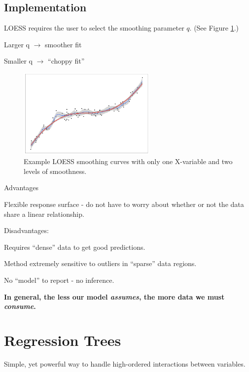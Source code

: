 \documentclass[12pt]{notes}
\begin{document}
\subsection{Implementation}
LOESS requires the user to select the smoothing parameter $q$. (See Figure \ref{fig:loessCurve}.) 
\bi
\item Larger q $\rightarrow$ smoother fit
\item Smaller q $\rightarrow$ ``choppy fit''
\ei


\begin{figure}[H]
\centering
\includegraphics[width = 0.6\textwidth]{figures/module4/loessCurve.png}
\caption{Example LOESS smoothing curves with only one X-variable and two levels of smoothness.}
\label{fig:loessCurve}
\end{figure}

\bi
\item Advantages
\bi
\item Flexible response surface - do not have to worry about whether or not the data share a linear relationship. 
\ei
\item Disadvantages:
\bi
\item Requires ``dense'' data to get good predictions. 
\bi
\item Method extremely sensitive to outliers in ``sparse'' data regions. 
\ei
\item No ``model'' to report - no inference. 
\ei
\ei

\textbf{In general, the less our model \textit{assumes}, the more data we must \textit{consume}.}

\newpage
\section{Regression Trees}
Simple, yet powerful way to handle high-ordered interactions between variables. 
\end{document}
